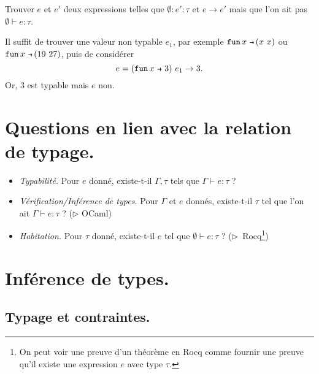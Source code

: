 \documentclass[../main]{subfiles}
\begin{document}
  \begin{exo}
    Trouver $e$ et $e'$ deux expressions telles que $\emptyset : e' : \tau$ et $e \to e'$ mais que l'on ait pas $\emptyset \vdash e : \tau$.
  \end{exo}
  \begin{sol}
    Il suffit de trouver une valeur non typable $e_1$, par exemple $\fun x (x\ x)$ ou  $\fun x (19\ 27)$, puis de considérer \[
      e = (\fun x 3)\ e_1 \to 3
    .\]
    Or, $3$ est typable mais $e$ non.
  \end{sol}

  \section{Questions en lien avec la relation de typage.}

  \begin{itemize}
    \item \textit{Typabilité.} Pour $e$ donné, existe-t-il $\Gamma, \tau$ tels que $\Gamma \vdash  e : \tau$ ?
    \item \textit{Vérification/Inférence de types.}
      Pour $\Gamma$ et $e$ donnés, existe-t-il  $\tau$ tel que l'on ait $\Gamma \vdash e : \tau$ ? ($\triangleright$ OCaml)
    \item \textit{Habitation.} Pour $\tau$ donné, existe-t-il  $e$ tel que $\emptyset \vdash e : \tau$ ? ($\triangleright$~Rocq\footnote{On peut voir une preuve d'un théorème en Rocq comme fournir une preuve qu'il existe une expression $e$ avec type $\tau$.}\showfootnote)
  \end{itemize}

  \section{Inférence de types.}

  \subsection{Typage et contraintes.}
\end{document}
